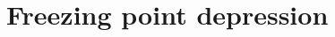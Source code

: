 \documentclass{book}
\begin{document}
 
 
 
 \newcommand\chapterlabel{}\newcommand\ChapterNameLabel{}\newcommand\labname{}\newcommand\chapterpathtocontent{}\newcommand\chapterpathtoimages{}\newcommand\chapterpath{} 

\section{Freezing point depression}
\renewcommand\chapterlabel{Ch-solutions}\renewcommand\ChapterNameLabel{\chapterlabel}\renewcommand\labname{freezingpointdepression}\renewcommand\chapterpathtocontent{../../}\renewcommand\chapterpathtoimages{\chapterpathtocontent}\renewcommand\chapterpath{../../\chapterlabel/LAB-\labname/}
\end{document}
